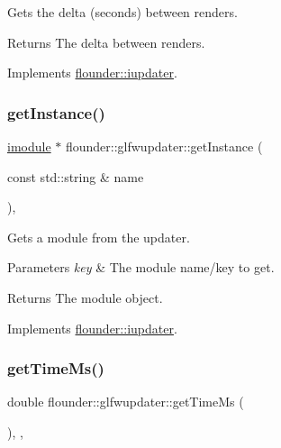 Gets the delta (seconds) between renders. 

\begin{DoxyReturn}{Returns}
The delta between renders. 
\end{DoxyReturn}


Implements \hyperlink{classflounder_1_1iupdater_a00d7cf530cfbd7f83c8903328da14027}{flounder\+::iupdater}.

\mbox{\label{classflounder_1_1glfwupdater_a284945635b93ffc1bd6164ff20565349}} 
\subsubsection{\texorpdfstring{get\+Instance()}{getInstance()}}
{\footnotesize\ttfamily \hyperlink{classflounder_1_1imodule}{imodule} $\ast$ flounder\+::glfwupdater\+::get\+Instance (\begin{DoxyParamCaption}\item[{const std\+::string \&}]{name }\end{DoxyParamCaption})\hspace{0.3cm}{\ttfamily [override]}, {\ttfamily [virtual]}}



Gets a module from the updater. 


\begin{DoxyParams}{Parameters}
{\em key} & The module name/key to get. \\
\hline
\end{DoxyParams}
\begin{DoxyReturn}{Returns}
The module object. 
\end{DoxyReturn}


Implements \hyperlink{classflounder_1_1iupdater_a391b1788b5c139b199ed48033da1b88d}{flounder\+::iupdater}.

\mbox{\label{classflounder_1_1glfwupdater_a1c3b884efb6e785143db556d4db9bdc8}} 
\subsubsection{\texorpdfstring{get\+Time\+Ms()}{getTimeMs()}}
{\footnotesize\ttfamily double flounder\+::glfwupdater\+::get\+Time\+Ms (\begin{DoxyParamCaption}{ }\end{DoxyParamCaption})\hspace{0.3cm}{\ttfamily [inline]}, {\ttfamily [override]}, {\ttfamily [virtual]}}



